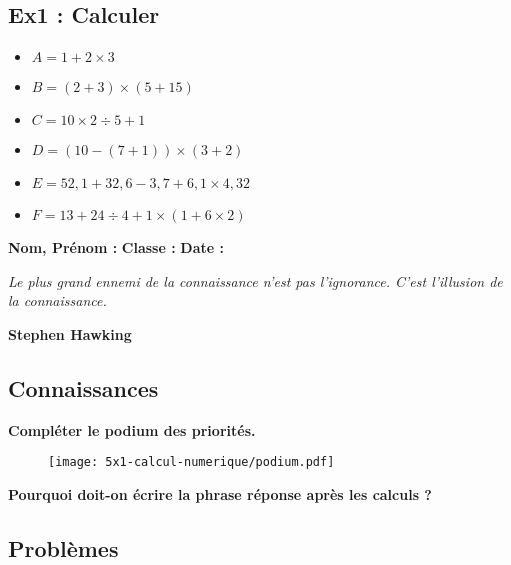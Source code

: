 \newpage

\subsection*{Ex1 : Calculer}

\begin{multicols}{3}\begin{itemize}[label={$\bullet$}]
  \item $A = 1 + 2 \times 3$ 
  \item $B = (2+3) \times (5+15)$
  \item $C = 10 \times 2 \div 5 + 1$
  \item $D = (10 - (7 + 1)) \times (3 + 2)$
  \item $E = 52,1 + 32,6 - 3,7 + 6,1 \times 4,32$
  \item $F = 13 + 24 \div 4 + 1 \times (1 + 6 \times 2)$
\end{itemize}\end{multicols}

\Pointilles[48]

\newpage

\textbf{Nom, Prénom :} \hspace{8cm} \textbf{Classe :} \hspace{3cm} \textbf{Date :}\\

\begin{center}
  \textit{Le plus grand ennemi de la connaissance n'est pas l'ignorance. C'est l'illusion de la connaissance.} 
  
  \textbf{Stephen Hawking}
\end{center}

\subsection*{Connaissances} 

\textbf{Compléter le podium des priorités.} 
\begin{figure}[H]
  \centering
  \texttt{[image: 5x1-calcul-numerique/podium.pdf]}
\end{figure} 

\textbf{Pourquoi doit-on écrire la phrase réponse après les calculs ?} \\ \Pointilles[2]


\subsection*{Problèmes}


